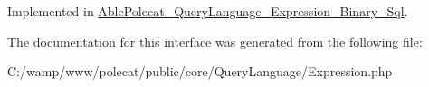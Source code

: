 Implemented in \hyperlink{class_able_polecat___query_language___expression___binary___sql_a7516ca30af0db3cdbf9a7739b48ce91d}{Able\+Polecat\+\_\+\+Query\+Language\+\_\+\+Expression\+\_\+\+Binary\+\_\+\+Sql}.



The documentation for this interface was generated from the following file\+:\begin{DoxyCompactItemize}
\item 
C\+:/wamp/www/polecat/public/core/\+Query\+Language/Expression.\+php\end{DoxyCompactItemize}
